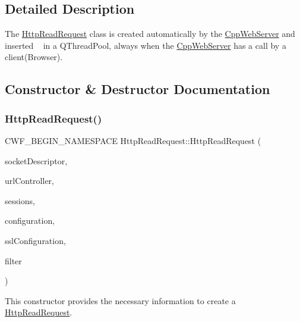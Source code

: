 \subsection{Detailed Description}
The \hyperlink{class_http_read_request}{Http\+Read\+Request} class is created automatically by the \hyperlink{class_cpp_web_server}{Cpp\+Web\+Server} and inserted ~\newline
 in a Q\+Thread\+Pool, always when the \hyperlink{class_cpp_web_server}{Cpp\+Web\+Server} has a call by a client(\+Browser). 

\subsection{Constructor \& Destructor Documentation}
\mbox{\label{class_http_read_request_a5522be561914b951ebaf580feb2c749a}} 
\subsubsection{\texorpdfstring{Http\+Read\+Request()}{HttpReadRequest()}}
{\footnotesize\ttfamily C\+W\+F\+\_\+\+B\+E\+G\+I\+N\+\_\+\+N\+A\+M\+E\+S\+P\+A\+CE Http\+Read\+Request\+::\+Http\+Read\+Request (\begin{DoxyParamCaption}\item[{qintptr}]{socket\+Descriptor,  }\item[{\hyperlink{class_q_map_thread_safety}{Q\+Map\+Thread\+Safety}$<$ Q\+String, \hyperlink{class_controller}{Controller} $\ast$$>$ \&}]{url\+Controller,  }\item[{\hyperlink{class_q_map_thread_safety}{Q\+Map\+Thread\+Safety}$<$ Q\+String, \hyperlink{class_session}{Session} $\ast$$>$ \&}]{sessions,  }\item[{const \hyperlink{class_configuration}{Configuration} \&}]{configuration,  }\item[{Q\+Ssl\+Configuration $\ast$}]{ssl\+Configuration,  }\item[{\hyperlink{class_filter}{Filter} $\ast$}]{filter }\end{DoxyParamCaption})}



This constructor provides the necessary information to create a \hyperlink{class_http_read_request}{Http\+Read\+Request}. 


